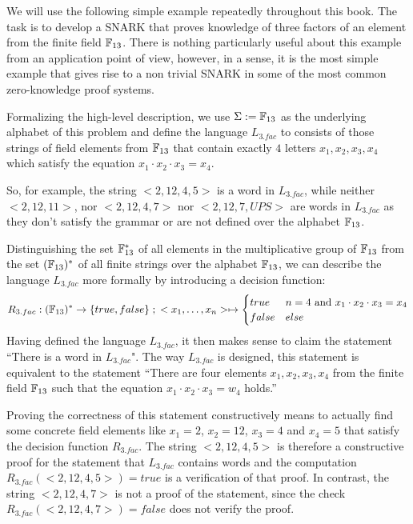 \begin{example}[3-Factorization]\label{ex:3-factorization} We will use the following simple example repeatedly throughout this book. The task is to develop a SNARK that proves knowledge of three factors of an element from the finite field $\mathbb{F}_{13}$. There is nothing particularly useful about this example from an application point of view, however, in a sense, it is the most simple example that gives rise to a non trivial SNARK in some of the most common zero-knowledge proof systems. 

Formalizing the high-level description, we use $\Sigma := \mathbb{F}_{13}$ as the underlying alphabet of this problem and define the language $L_{3.fac}$ to consists of those strings of field elements from $\mathbb{F}_{13}$ that contain exactly $4$ letters $x_1,x_2,x_3,x_4$ which satisfy the equation $x_1\cdot x_2\cdot x_3 =x_4$.

So, for example, the string $<2, 12, 4, 5>$ is a word in $L_{3.fac}$, while neither $<2, 12, 11>$, nor $<2, 12, 4, 7>$ nor $<2, 12, 7, UPS>$ are words in $L_{3.fac}$ as they don't satisfy the grammar or are not defined over the alphabet $\mathbb{F}_{13}$. 

Distinguishing the set $\mathbb{F}_{13}^*$ of all elements in the multiplicative group of $\mathbb{F}_{13}$ from the set $(\mathbb{F}_{13})^*$ of all finite strings over the alphabet $\mathbb{F}_{13}$, we can describe the language $L_{3.fac}$ more formally by introducing a decision function:
$$
R_{3.fac} : (\mathbb{F}_{13})^* \to \{true, false\}\;;\;
<x_1,\ldots,x_n> \mapsto
\begin{cases}
true & n=4 \text{ and } x_1\cdot x_2 \cdot x_3 = x_4\\
false & else
\end{cases}
$$
Having defined the language $L_{3.fac}$, it then makes sense to claim the statement ``There is a word in $L_{3.fac}$". The way $L_{3.fac}$ is designed, this statement is equivalent to the statement ``There are four elements $x_1,x_2,x_3,x_4$ from the finite field $\mathbb{F}_{13}$ such that the equation $x_1\cdot x_2\cdot x_3 =w_4$ holds.''

Proving the correctness of this statement constructively means to actually find some concrete field elements like $x_1= 2$, $x_2 =12$, $x_3=4$ and $x_4 = 5$ that satisfy the decision function $R_{3.fac}$. The string $<2,12,4,5>$ is therefore a constructive proof for the statement that $L_{3.fac}$ contains words and the computation $R_{3.fac}(<2,12,4,5>)=true$ is a verification of that proof. In contrast, the string $<2, 12, 4, 7>$ is not a proof of the statement, since the check $R_{3.fac}(<2,12,4,7>)=false$ does not verify the proof.
\end{example}
